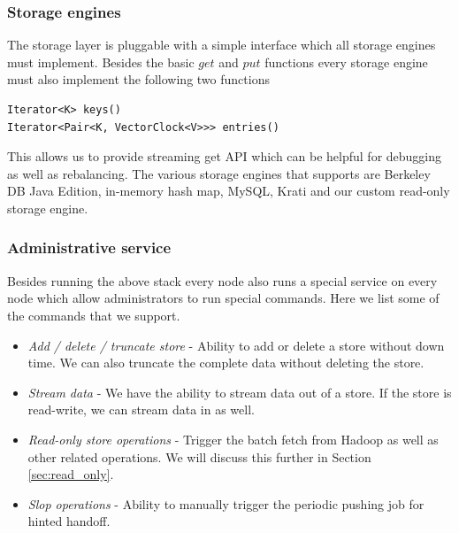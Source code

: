 \documentclass[10pt,twocolumn,preprint,nonatbib,numbers]{sigplanconf}
\begin{document}

\subsubsection {Storage engines}
\label{sec:system_architecture:system_components:storage_engine}

The storage layer is pluggable with a simple interface which all storage engines must implement. Besides the basic $get$ and $put$ functions every storage engine must also implement the following two functions 

\scriptsize
\begin{verbatim}
Iterator<K> keys() 
Iterator<Pair<K, VectorClock<V>>> entries()
\end{verbatim}  
\normalsize

This allows us to provide streaming get API which can be helpful for debugging as well as rebalancing. The various storage engines that \projectname{} supports are Berkeley DB Java Edition, in-memory hash map, MySQL, Krati and our custom read-only storage engine. 


\subsubsection{Administrative service}
\label{sec:system_architecture:system_components:admin_service}

Besides running the above stack every node also runs a special service on every node which allow administrators to run special commands. Here we list some of the commands that we support.

\begin{itemize}
	
	\item \emph{Add / delete / truncate store} - Ability to add or delete a store without down time. We can also truncate the complete data without deleting the store. 
	\item \emph{Stream data} - We have the ability to stream data out of a store. If the store is read-write, we can stream data in as well. 
	\item \emph{Read-only store operations} - Trigger the batch fetch from Hadoop as well as other related operations. We will discuss this further in Section \ref{sec:read_only}. 
	\item \emph{Slop operations} - Ability to manually trigger the periodic pushing job for hinted handoff. 
	
\end{itemize}
\end{document}
